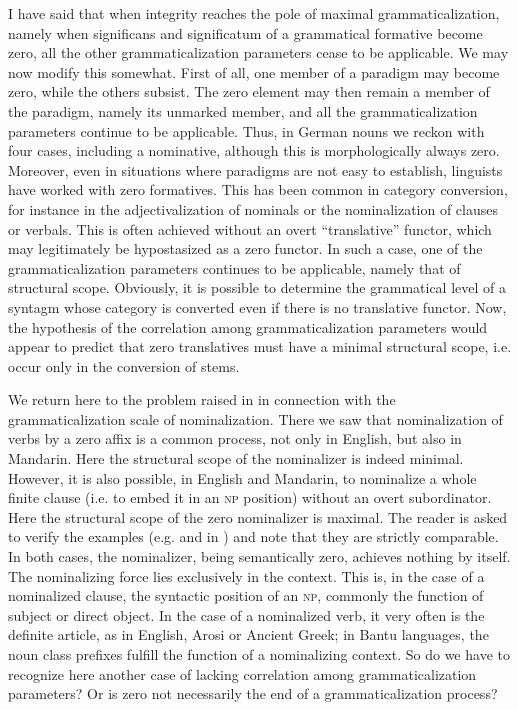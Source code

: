 I have said that when integrity reaches the pole of maximal grammaticalization, namely when significans and significatum of a grammatical formative become zero, all the other grammaticalization parameters cease to be applicable. We may now modify this somewhat. First of all, one member of a paradigm may become zero, while the others subsist. The zero element may then remain a member of the paradigm, namely its unmarked member, and all the grammaticalization parameters continue to be applicable. Thus, in German nouns we reckon with four cases, including a nominative, although this is morphologically always zero. Moreover, even in situations where paradigms are not easy to establish, linguists have worked with zero formatives. This has been common in category conversion, for instance in the adjectivalization of nominals or the nominalization of clauses or verbals. This is often achieved without an overt ``translative'' functor, which may legitimately be hypostasized as a zero functor. In such a case, one of the grammaticalization parameters continues to be applicable, namely that of structural scope. Obviously, it is possible to determine the grammatical level of a syntagm whose category is converted even if there is no translative functor. Now, the hypothesis of the correlation among grammaticalization parameters would appear to predict that zero translatives must have a minimal structural scope, i.e. occur only in the conversion of stems.

We return here to the problem raised in  in connection with the grammaticalization scale of nominalization. There we saw that nominalization of verbs by a zero affix is a common process, not only in English, but also in Mandarin. Here the structural scope of the nominalizer is indeed minimal. However, it is also possible, in English and Mandarin, to nominalize a whole finite clause (i.e. to embed it in an \textsc{np} position) without an overt subordinator. Here the structural scope of the zero nominalizer is maximal. The reader is asked to verify the examples (e.g.  and  in ) and note that they are strictly comparable. In both cases, the nominalizer, being semantically zero, achieves nothing by itself. The nominalizing force lies exclusively in the context. This is, in the case of a nominalized clause, the syntactic position of an \textsc{np}, commonly the function of subject or direct object. In the case of a nominalized verb, it very often is the definite article, as in English, Arosi or Ancient Greek; in Bantu languages, the noun class prefixes fulfill the function of a nominalizing context. So do we have to recognize here another case of lacking correlation among grammaticalization parameters? Or is zero not necessarily the end of a grammaticalization process?

